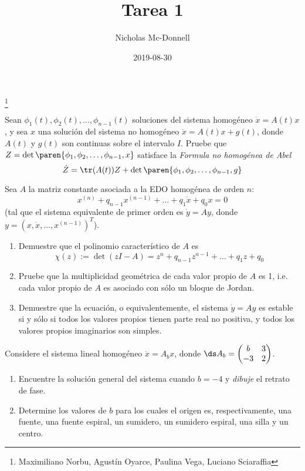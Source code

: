 \documentclass{homework}
\title{Tarea 1}
\date{2019-08-30}
\author{Nicholas Mc-Donnell}
\begin{document}
\maketitle
\thanks{Maximiliano Norbu, Agustín Oyarce, Paulina Vega, Luciano Sciaraffia}
\newpage
\tableofcontents
\newpage
{}

\begin{prob}
    Sean \(\phi_1(t),\phi_2(t),\dots,\phi_{n-1}(t)\) soluciones del sistema homogéneo \(\dot{x}=A(t)x\), y sea \(x\) una solución del sistema no homogéneo \(\dot{x}=A(t)x+g(t)\), donde \(A(t)\) y \(g(t)\) son continuas sobre el intervalo \(I\). Pruebe que \(Z=\det\paren{\phi_1,\phi_2,\dots,\phi_{n-1},x}\) satisface la \textit{Formula no homogénea de Abel}
    \[\dot{Z}=\tr(A(t))Z+\det\paren{\phi_1,\phi_2,\dots,\phi_{n-1},g}\]
\end{prob}

\begin{sol}
    
\end{sol}

\begin{prob}
    Sea \(A\) la matriz constante asociada a la EDO homogénea de orden \(n\):
    \[x^{(n)}+q_{n-1}x^{(n-1)}+\dots+q_1\dot{x}+q_0x=0\]
    (tal que el sistema equivalente de primer orden es \(\dot{y}=Ay\), donde \(y=(x,\dot{x},\dots,x^{(n-1)})^T\)).
    \begin{enumerate}[label=(\alph*)]
        \item Demuestre que el polinomio característico de \(A\) es
        \[\chi(z):=\det(zI-A)=z^n+q_{n-1}z^{n-1}+\dots+q_1z+q_0\]
        \item Pruebe que la multiplicidad geométrica de cada valor propio de \(A\) es 1, i.e. cada valor propio de \(A\) es asociado con sólo un bloque de Jordan.
        \item Demuestre que la ecuación, o equivalentemente, el sistema \(\dot{y}=Ay\) es estable si y sólo si todos los valores propios tienen parte real no positiva, y todos los valores propios imaginarios son simples.
    \end{enumerate}
\end{prob}

\begin{sol}
    
\end{sol}

\begin{prob}
    Considere el sistema lineal homogéneo \(\dot{x}=A_bx\), donde \(\ds A_b=\begin{pmatrix}
        b & 3\\-3 & 2
    \end{pmatrix}\).
    \begin{enumerate}[label=(\alph*)]
        \item Encuentre la solución general del sistema cuando \(b=-4\) y \textit{dibuje} el retrato de fase.
        \item Determine los valores de \(b\) para los cuales el origen es, respectivamente, una fuente, una fuente espiral, un sumidero, un sumidero espiral, una silla y un centro.
    \end{enumerate}
\end{prob}
\end{document}

